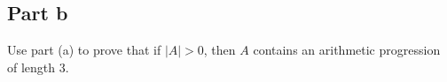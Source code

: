 \subsection{Part b}

\begin{question}
    Use part (a) to prove that if $|A|>0$, then $A$ contains an arithmetic progression of length 3.
\end{question}

\begin{answer}
    
\end{answer}